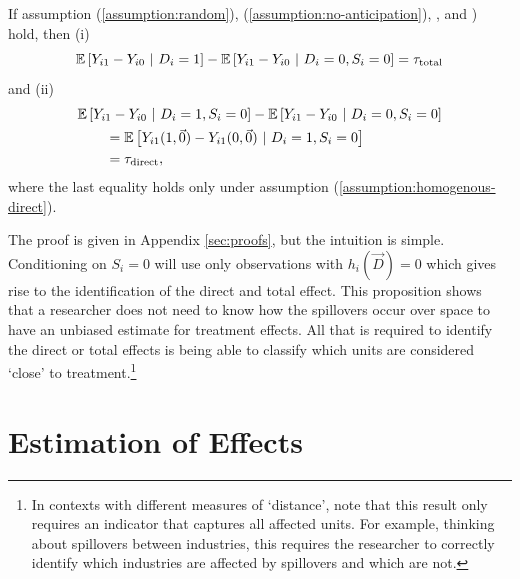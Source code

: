\documentclass[11pt]{article}
\begin{document}
\begin{proposition}\label{thm:remove_bias}
    If assumption (\ref{assumption:random}), (\ref{assumption:no-anticipation}), , and ) hold, then (i) 
    \begin{equation}\label{eq:id_total}
        \mathbb{E}\left[Y_{i1} - Y_{i0} \ \vert \ D_i = 1\right] - \mathbb{E}\left[Y_{i1} - Y_{i0} \ \vert \ D_i = 0, S_{i} = 0\right] = \tau_{\text{total}}
    \end{equation}
    and (ii) 
    \begin{align}\begin{split}\label{eq:id_direct}
        &\mathbb{E}\left[Y_{i1} - Y_{i0} \ \vert \ D_i = 1, S_{i} = 0 \right] - \mathbb{E}\left[Y_{i1} - Y_{i0} \ \vert \ D_i = 0, S_{i} = 0 \right] \\
        &\quad\quad= \mathbb{E}\left[Y_{i1}(1, \vec{0}) - Y_{i1}(0, \vec{0}) \ \vert \ D_i = 1, S_i = 0\right]\\
        &\quad\quad= \tau_{\text{direct}},
    \end{split}\end{align}
    where the last equality holds only under assumption (\ref{assumption:homogenous-direct}).
\end{proposition}

The proof is given in Appendix \ref{sec:proofs}, but the intuition is simple. Conditioning on $S_i = 0$ will use only observations with $h_i(\vec{D}) = 0$ which gives rise to the identification of the direct and total effect. 
This proposition shows that a researcher does not need to know how the spillovers occur over space to have an unbiased estimate for treatment effects. All that is required to identify the direct or total effects is being able to classify which units are considered `close' to treatment.\footnote{In contexts with different measures of `distance', note that this result only requires an indicator that captures all affected units. For example, thinking about spillovers between industries, this requires the researcher to correctly identify which industries are affected by spillovers and which are not.} 

\section{Estimation of Effects}\label{sec:estimation}
\end{document}
